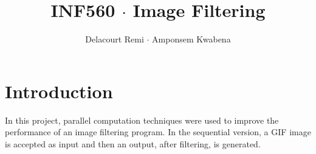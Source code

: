 \documentclass[11pt]{article}
\title{INF560 $\cdot$ Image Filtering}
\author{Delacourt Remi $\cdot$ Amponsem Kwabena}
\begin{document}
\maketitle
\newpage
\tableofcontents
\newpage

\section{Introduction}

In this project, parallel computation techniques were used to improve the performance of an image filtering program. In the sequential version, a GIF image is accepted as input and then an output, after filtering, is generated.
\begin{figure}[h]
	\centering

\end{figure}
\end{document}
